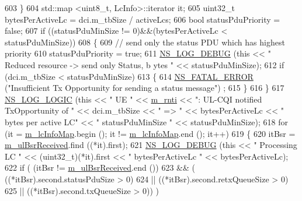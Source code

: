 \begin{DoxyCode}
603             \}
604           std::map <uint8\_t, LcInfo>::iterator it;
605           uint32\_t bytesPerActiveLc = dci.m\_tbSize / activeLcs;
606           \textcolor{keywordtype}{bool} statusPduPriority = \textcolor{keyword}{false};
607           \textcolor{keywordflow}{if} ((statusPduMinSize != 0)&&(bytesPerActiveLc < statusPduMinSize))
608             \{
609               \textcolor{comment}{// send only the status PDU which has highest priority}
610               statusPduPriority = \textcolor{keyword}{true};
611               \hyperlink{group__logging_ga413f1886406d49f59a6a0a89b77b4d0a}{NS\_LOG\_DEBUG} (\textcolor{keyword}{this} << \textcolor{stringliteral}{" Reduced resource -> send only Status, b ytes "} << 
      statusPduMinSize);
612               \textcolor{keywordflow}{if} (dci.m\_tbSize < statusPduMinSize)
613                 \{
614                   \hyperlink{group__fatal_ga5131d5e3f75d7d4cbfd706ac456fdc85}{NS\_FATAL\_ERROR} (\textcolor{stringliteral}{"Insufficient Tx Opportunity for sending a status message"})
      ;
615                 \}
616             \}
617           \hyperlink{group__logging_ga88acd260151caf2db9c0fc84997f45ce}{NS\_LOG\_LOGIC} (\textcolor{keyword}{this} << \textcolor{stringliteral}{" UE "} << \hyperlink{classns3_1_1LteUeMac_a95e386ad717fad6e09de8c139fe0ca89}{m\_rnti} << \textcolor{stringliteral}{": UL-CQI notified TxOpportunity of "}
       << dci.m\_tbSize << \textcolor{stringliteral}{" => "} << bytesPerActiveLc << \textcolor{stringliteral}{" bytes per active LC"} << \textcolor{stringliteral}{" statusPduMinSize "} << 
      statusPduMinSize);
618           \textcolor{keywordflow}{for} (it = \hyperlink{classns3_1_1LteUeMac_af4d5b382d725f5e2fbf18dcdb60401ed}{m\_lcInfoMap}.begin (); it != \hyperlink{classns3_1_1LteUeMac_af4d5b382d725f5e2fbf18dcdb60401ed}{m\_lcInfoMap}.end (); it++)
619             \{
620               itBsr = \hyperlink{classns3_1_1LteUeMac_ab1de37ecba7b76c9de1dd81bf49ac66d}{m\_ulBsrReceived}.find ((*it).first);
621               \hyperlink{group__logging_ga413f1886406d49f59a6a0a89b77b4d0a}{NS\_LOG\_DEBUG} (\textcolor{keyword}{this} << \textcolor{stringliteral}{" Processing LC "} << (uint32\_t)(*it).first << \textcolor{stringliteral}{"
       bytesPerActiveLc "} << bytesPerActiveLc);
622               \textcolor{keywordflow}{if} ( (itBsr != \hyperlink{classns3_1_1LteUeMac_ab1de37ecba7b76c9de1dd81bf49ac66d}{m\_ulBsrReceived}.end ())
623                    && ( ((*itBsr).second.statusPduSize > 0)
624                         || ((*itBsr).second.retxQueueSize > 0)
625                         || ((*itBsr).second.txQueueSize > 0)) )

\end{DoxyCode}
